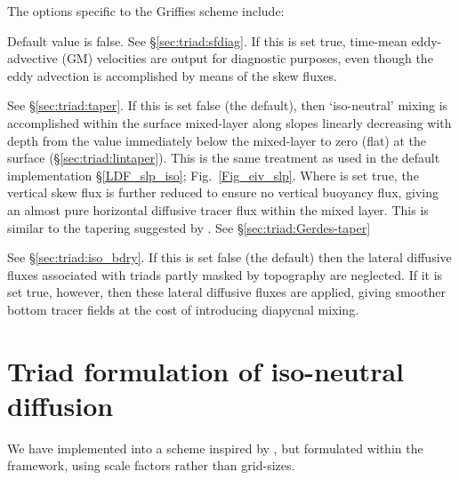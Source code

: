 \documentclass[NEMO_book]{subfiles}
\begin{document}
The options specific to the Griffies scheme include:
\begin{description}[font=\normalfont]
\item[\np{ln\_traldf\_gdia}] Default value is false. See \S\ref{sec:triad:sfdiag}. If this is set true, time-mean
  eddy-advective (GM) velocities are output for diagnostic purposes, even
  though the eddy advection is accomplished by means of the skew
  fluxes.
\item[\np{ln\_traldf\_iso}] See \S\ref{sec:triad:taper}. If this is set false (the default), then
  `iso-neutral' mixing is accomplished within the surface mixed-layer
  along slopes linearly decreasing with depth from the value immediately below
  the mixed-layer to zero (flat) at the surface (\S\ref{sec:triad:lintaper}). This is the same
  treatment as used in the default implementation
  \S\ref{LDF_slp_iso}; Fig.~\ref{Fig_eiv_slp}.  Where
   is set true, the vertical skew flux is further
  reduced to ensure no vertical buoyancy flux, giving an almost pure
  horizontal diffusive tracer flux within the mixed layer. This is similar to
  the tapering suggested by \citet{Gerdes1991}. See \S\ref{sec:triad:Gerdes-taper}
\item[\np{ln\_traldf\_botmix}] See \S\ref{sec:triad:iso_bdry}. If this
  is set false (the default) then the lateral diffusive fluxes
  associated with triads partly masked by topography are neglected. If
  it is set true, however, then these lateral diffusive fluxes are
  applied, giving smoother bottom tracer fields at the cost of
  introducing diapycnal mixing.
\end{description}
\section{Triad formulation of iso-neutral diffusion}
\label{sec:triad:iso}
We have implemented into \NEMO a scheme inspired by \citet{Griffies_al_JPO98}, but formulated within the \NEMO
framework, using scale factors rather than grid-sizes.
\end{document}
